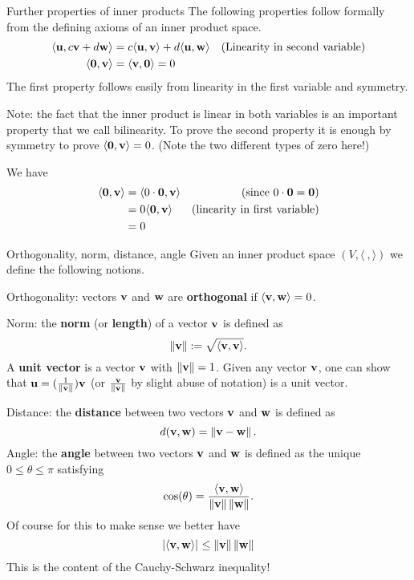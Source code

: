 \begin{frame}{Further properties of inner products}
The following properties follow formally from the defining axioms of an inner product space. 
\begin{align*}
\langle{\mathbf u},c{\mathbf v}+d{\mathbf w}\rangle&=c\langle{\mathbf u},{\mathbf v}\rangle+d\langle{\mathbf u},{\mathbf w}\rangle &\text{(Linearity in second variable)} \\
\langle{\mathbf 0},{\mathbf v}\rangle&=\langle{\mathbf v},{\mathbf 0}\rangle=0
\end{align*} 
\pause 
The first property follows easily from linearity in the first variable and symmetry. 

Note: the fact that the inner product is linear in both variables is an important property that we call \alert{bilinearity}. 
\bpause
To prove the second property it is enough by symmetry to prove $\langle{\mathbf 0},{\mathbf v}\rangle=0$. (Note the two different types of zero here!)

\pause
We have 
\begin{align*}
\langle{\mathbf 0},{\mathbf v}\rangle&=\langle 0\cdot{\mathbf 0},{\mathbf v}\rangle &\text{(since $0\cdot{\mathbf 0}={\mathbf 0}$)}\\
&=0\langle{\mathbf 0},{\mathbf v}\rangle &\text{(linearity in first variable)}\\
&=0
\end{align*} 
\end{frame}
\begin{frame}{Orthogonality, norm, distance, angle}
Given an inner product space $(V, \langle \ , \rangle)$ we define the following notions. 

\pause
\alert{Orthogonality}: vectors ${\mathbf v}$ and ${\mathbf w}$ are {\bf orthogonal} if $\langle {\mathbf v},{\mathbf w}\rangle=0$. 

\alert{Norm}: the {\bf norm} (or {\bf length}) of a vector ${\mathbf v}$ is defined as 
\[
\left\lVert{\mathbf v}\right\rVert:=\sqrt{\langle{\mathbf v},{\mathbf v}\rangle}.
\]
A {\bf unit vector} is a vector ${\mathbf v}$ with $\left\lVert{\mathbf v}\right\rVert=1$. Given any vector ${\mathbf v}$, one can show that ${\mathbf u}=(\frac{1}{\left\lVert{\mathbf v}\right\rVert}){\mathbf v}$ (or $\frac{{\mathbf v}}{\left\lVert{\mathbf v}\right\rVert}$ by slight abuse of notation) is a unit vector. 

\pause
\alert{Distance:} the {\bf distance} between two vectors ${\mathbf v}$ and ${\mathbf w}$ is defined as 
\[
d({\mathbf v},{\mathbf w})=\left\lVert{\mathbf v}-{\mathbf w}\right\rVert.
\]
\pause
\alert{Angle:} the {\bf angle} between two vectors ${\mathbf v}$ and ${\mathbf w}$ is defined as the unique $0\leq \theta \leq \pi$ satisfying 
\[
\cos(\theta)=\frac{\langle{\mathbf v},{\mathbf w}\rangle}{\left\lVert{\mathbf v}\right\rVert\left\lVert{\mathbf w}\right\rVert}.
\]
\pause Of course for this to make sense we better have 
\[
\left\lvert \langle{\mathbf v},{\mathbf w}\rangle\right\rvert_{}\leq\left\lVert{\mathbf v}\right\rVert\left\lVert{\mathbf w}\right\rVert
\]
This is the content of the Cauchy-Schwarz inequality! 
\end{frame}

